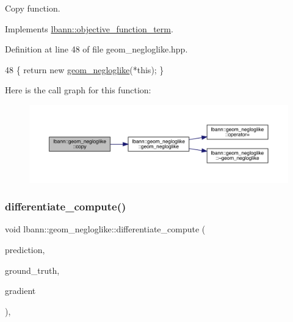 Copy function. 

Implements \hyperlink{classlbann_1_1objective__function__term_ae98a4ec173a602ad55d1df20dadd4cb9}{lbann\+::objective\+\_\+function\+\_\+term}.



Definition at line 48 of file geom\+\_\+negloglike.\+hpp.


\begin{DoxyCode}
48 \{ \textcolor{keywordflow}{return} \textcolor{keyword}{new} \hyperlink{classlbann_1_1geom__negloglike_a2cd89175b2c6ec556b9697aa75d6068e}{geom\_negloglike}(*\textcolor{keyword}{this}); \}
\end{DoxyCode}
Here is the call graph for this function\+:\nopagebreak
\begin{figure}[H]
\begin{center}
\leavevmode
\includegraphics[width=350pt]{classlbann_1_1geom__negloglike_aa9be2be40a9bbc9599c2e2de3c01872e_cgraph}
\end{center}
\end{figure}
\mbox{\label{classlbann_1_1geom__negloglike_ac87d97a78cc3bb00f976bcd604fc72d7}} 
\subsubsection{\texorpdfstring{differentiate\+\_\+compute()}{differentiate\_compute()}}
{\footnotesize\ttfamily void lbann\+::geom\+\_\+negloglike\+::differentiate\+\_\+compute (\begin{DoxyParamCaption}\item[{const \hyperlink{base_8hpp_a9a697a504ae84010e7439ffec862b470}{Abs\+Dist\+Mat} \&}]{prediction,  }\item[{const \hyperlink{base_8hpp_a9a697a504ae84010e7439ffec862b470}{Abs\+Dist\+Mat} \&}]{ground\+\_\+truth,  }\item[{\hyperlink{base_8hpp_a9a697a504ae84010e7439ffec862b470}{Abs\+Dist\+Mat} \&}]{gradient }\end{DoxyParamCaption})\hspace{0.3cm}{\ttfamily [override]}, {\ttfamily [virtual]}}

